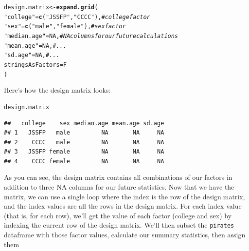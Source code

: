 \documentclass{tufte-book}\usepackage[]{graphicx}\usepackage[]{color}
\makeatletter
\newcommand{\hlnum}[1]{\textcolor[rgb]{0.686,0.059,0.569}{#1}}%
\newcommand{\hlstr}[1]{\textcolor[rgb]{0.192,0.494,0.8}{#1}}%
\newcommand{\hlcom}[1]{\textcolor[rgb]{0.678,0.584,0.686}{\textit{#1}}}%
\newcommand{\hlstd}[1]{\textcolor[rgb]{0.345,0.345,0.345}{#1}}%
\newcommand{\hlkwb}[1]{\textcolor[rgb]{0.69,0.353,0.396}{#1}}%
\newcommand{\hlkwc}[1]{\textcolor[rgb]{0.333,0.667,0.333}{#1}}%
\newcommand{\hlkwd}[1]{\textcolor[rgb]{0.737,0.353,0.396}{\textbf{#1}}}%
\newenvironment{kframe}{%
 \def\at@end@of@kframe{}%
 \ifinner\ifhmode%
  \def\at@end@of@kframe{\end{minipage}}%
  \begin{minipage}{\columnwidth}%
 \fi\fi%
 \def\FrameCommand##1{\hskip\@totalleftmargin \hskip-\fboxsep
 \colorbox{shadecolor}{##1}\hskip-\fboxsep
     \hskip-\linewidth \hskip-\@totalleftmargin \hskip\columnwidth}%
 \MakeFramed {\advance\hsize-\width
   \@totalleftmargin\z@ \linewidth\hsize
   \@setminipage}}%
 {\par\unskip\endMakeFramed%
 \at@end@of@kframe}
\newenvironment{knitrout}{}{} %
\makeatother
\begin{document}
\begin{knitrout}
\color{fgcolor}\begin{kframe}
\begin{alltt}
\hlstd{design.matrix} \hlkwb{<-} \hlkwd{expand.grid}\hlstd{(}
                             \hlstr{"college"} \hlstd{=} \hlkwd{c}\hlstd{(}\hlstr{"JSSFP"}\hlstd{,} \hlstr{"CCCC"}\hlstd{),} \hlcom{# college factor}
                             \hlstr{"sex"} \hlstd{=} \hlkwd{c}\hlstd{(}\hlstr{"male"}\hlstd{,} \hlstr{"female"}\hlstd{),} \hlcom{# sex factor}
                             \hlstr{"median.age"} \hlstd{=} \hlnum{NA}\hlstd{,} \hlcom{# NA columns for our future calculations}
                             \hlstr{"mean.age"} \hlstd{=} \hlnum{NA}\hlstd{,} \hlcom{#...}
                             \hlstr{"sd.age"} \hlstd{=} \hlnum{NA}\hlstd{,} \hlcom{#...}
                             \hlkwc{stringsAsFactors} \hlstd{= F}
                             \hlstd{)}
\end{alltt}
\end{kframe}
\end{knitrout}

Here's how the design matrix looks:

\begin{knitrout}
\color{fgcolor}\begin{kframe}
\begin{alltt}
\hlstd{design.matrix}
\end{alltt}
\begin{verbatim}
##   college    sex median.age mean.age sd.age
## 1   JSSFP   male         NA       NA     NA
## 2    CCCC   male         NA       NA     NA
## 3   JSSFP female         NA       NA     NA
## 4    CCCC female         NA       NA     NA
\end{verbatim}
\end{kframe}
\end{knitrout}


As you can see, the design matrix contains all combinations of our factors in addition to three NA columns for our future statistics. Now that we have the matrix, we can use a single loop where the index is the row of the design.matrix, and the index values are all the rows in the design matrix. For each index value (that is, for each row), we'll get the value of each factor (college and sex) by indexing the current row of the design matrix. We'll then subset the \texttt{pirates} dataframe with those factor values, calculate our summary statistics, then assign them
\end{document}
